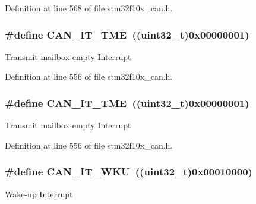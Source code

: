 Definition at line 568 of file stm32f10x\+\_\+can.\+h.

\subsubsection[{\texorpdfstring{C\+A\+N\+\_\+\+I\+T\+\_\+\+T\+ME}{CAN_IT_TME}}]{\setlength{\rightskip}{0pt plus 5cm}\#define C\+A\+N\+\_\+\+I\+T\+\_\+\+T\+ME~(({\bf uint32\+\_\+t})0x00000001)}\hypertarget{group___c_a_n__interrupts_ga619e36230fa2eb089a7c1936b5004eb9}{}\label{group___c_a_n__interrupts_ga619e36230fa2eb089a7c1936b5004eb9}
Transmit mailbox empty Interrupt 

Definition at line 556 of file stm32f10x\+\_\+can.\+h.

\subsubsection[{\texorpdfstring{C\+A\+N\+\_\+\+I\+T\+\_\+\+T\+ME}{CAN_IT_TME}}]{\setlength{\rightskip}{0pt plus 5cm}\#define C\+A\+N\+\_\+\+I\+T\+\_\+\+T\+ME~(({\bf uint32\+\_\+t})0x00000001)}\hypertarget{group___c_a_n__interrupts_ga619e36230fa2eb089a7c1936b5004eb9}{}\label{group___c_a_n__interrupts_ga619e36230fa2eb089a7c1936b5004eb9}
Transmit mailbox empty Interrupt 

Definition at line 556 of file stm32f10x\+\_\+can.\+h.

\subsubsection[{\texorpdfstring{C\+A\+N\+\_\+\+I\+T\+\_\+\+W\+KU}{CAN_IT_WKU}}]{\setlength{\rightskip}{0pt plus 5cm}\#define C\+A\+N\+\_\+\+I\+T\+\_\+\+W\+KU~(({\bf uint32\+\_\+t})0x00010000)}\hypertarget{group___c_a_n__interrupts_gac9c8767770d94de753dda9ad31f9af15}{}\label{group___c_a_n__interrupts_gac9c8767770d94de753dda9ad31f9af15}
Wake-\/up Interrupt 

